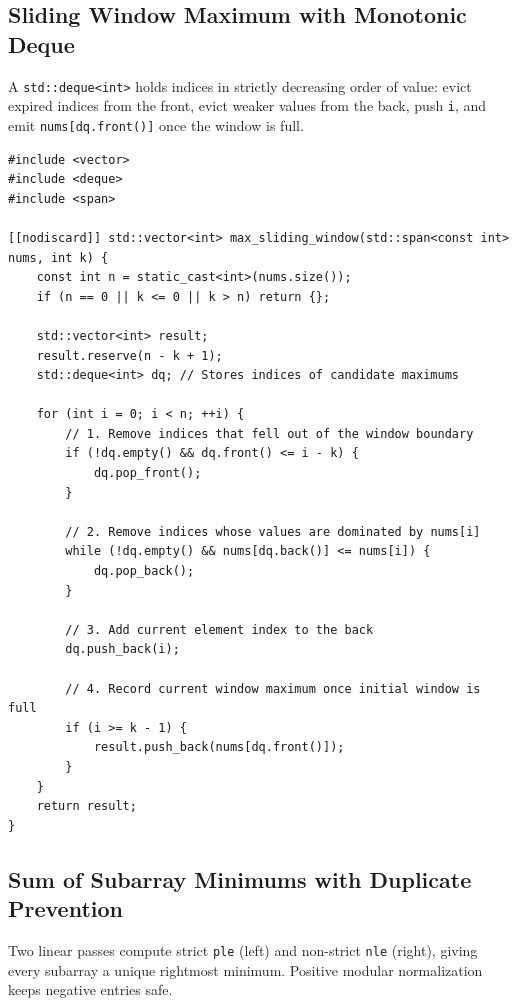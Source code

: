 \documentclass[11pt,a4paper]{article}
\theoremstyle{definition}
\begin{document}
\subsection{Sliding Window Maximum with Monotonic Deque}

A \texttt{std::deque<int>} holds indices in strictly decreasing order of value: evict expired indices from the front, evict weaker values from the back, push \texttt{i}, and emit \texttt{nums[dq.front()]} once the window is full.

\begin{lstlisting}[caption=Sliding Window Maximum in C++23]
#include <vector>
#include <deque>
#include <span>

[[nodiscard]] std::vector<int> max_sliding_window(std::span<const int> nums, int k) {
    const int n = static_cast<int>(nums.size());
    if (n == 0 || k <= 0 || k > n) return {};

    std::vector<int> result;
    result.reserve(n - k + 1);
    std::deque<int> dq; // Stores indices of candidate maximums

    for (int i = 0; i < n; ++i) {
        // 1. Remove indices that fell out of the window boundary
        if (!dq.empty() && dq.front() <= i - k) {
            dq.pop_front();
        }

        // 2. Remove indices whose values are dominated by nums[i]
        while (!dq.empty() && nums[dq.back()] <= nums[i]) {
            dq.pop_back();
        }

        // 3. Add current element index to the back
        dq.push_back(i);

        // 4. Record current window maximum once initial window is full
        if (i >= k - 1) {
            result.push_back(nums[dq.front()]);
        }
    }
    return result;
}
\end{lstlisting}

\subsection{Sum of Subarray Minimums with Duplicate Prevention}

Two linear passes compute strict \texttt{ple} (left) and non-strict \texttt{nle} (right), giving every subarray a unique rightmost minimum. Positive modular normalization keeps negative entries safe.
\end{document}
